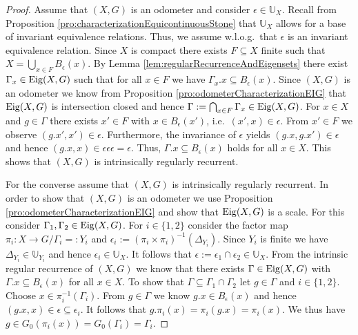 \documentclass[12pt, reqno]{amsart}
\theoremstyle{definition}
\theoremstyle{remark}
\numberwithin{equation}{section}
\theoremstyle{theorem}
\theoremstyle{remark}
\def\Eig{{\rm Eig}}
\begin{document}
\begin{proof}
    Assume that $(X,G)$ is an odometer and consider $\epsilon\in \mathbb{U}_X$. 
    Recall from Proposition \ref{pro:characterizationEquicontinuousStone} that $\mathbb{U}_X$ allows for a base of invariant equivalence relations. 
    Thus, we assume w.l.o.g.\ that $\epsilon$ is an invariant equivalence relation. 
    Since $X$ is compact there exists $F\subseteq X$ finite such that $X=\bigcup_{x\in F}B_\epsilon(x)$. 
    By Lemma \ref{lem:regularRecurrenceAndEigensets} there exist $\Gamma_x\in \Eig(X,G)$ such that for all $x\in F$ we have $\Gamma_x.x\subseteq B_\epsilon(x)$. 
    Since $(X,G)$ is an odometer we know from Proposition \ref{pro:odometerCharacterizationEIG} that $\Eig(X,G)$ is intersection closed and hence $\Gamma:=\bigcap_{x\in F}\Gamma_x\in \Eig(X,G)$. 
    For $x\in X$ and $g\in \Gamma$ there exists $x'\in F$ with $x\in B_\epsilon(x')$, i.e.\ $(x',x)\in \epsilon$.
    From $x'\in F$ we observe $(g.x',x')\in \epsilon$. 
    Furthermore, the invariance of $\epsilon$ yields $(g.x,g.x')\in \epsilon$
    and hence $(g.x,x)\in \epsilon\epsilon\epsilon=\epsilon$.
    Thus, $\Gamma.x\subseteq B_\epsilon(x)$ holds for all $x\in X$. 
    This shows that $(X,G)$ is intrinsically regularly recurrent. 

    For the converse assume that $(X,G)$ is intrinsically regularly recurrent. In order to show that $(X,G)$ is an odometer we use Proposition \ref{pro:odometerCharacterizationEIG} and show that $\Eig(X,G)$ is a scale. 
    For this consider $\Gamma_1,\Gamma_2\in \Eig(X,G)$. 
    For $i\in \{1,2\}$ consider the factor map $\pi_i\colon X\to G/ \Gamma_i=:Y_i$ and $\epsilon_i:=(\pi_i\times \pi_i)^{-1}(\Delta_{Y_i})$. 
    Since $Y_i$ is finite we have $\Delta_{Y_i}\in \mathbb{U}_{Y_i}$ and hence $\epsilon_i\in \mathbb{U}_{X}$. 
    It follows that $\epsilon:=\epsilon_1\cap \epsilon_2\in \mathbb{U}_X$. 
    From the intrinsic regular recurrence of $(X,G)$ we know that there exists $\Gamma\in \Eig(X,G)$ with $\Gamma.x\subseteq B_\epsilon(x)$ for all $x\in X$. 
    To show that $\Gamma\subseteq \Gamma_1\cap \Gamma_2$ let $g\in \Gamma$ and $i\in \{1,2\}$.
    Choose $x\in \pi_i^{-1}(\Gamma_i)$. 
    From $g\in \Gamma$ we know $g.x\in B_\epsilon(x)$ and hence $(g.x,x)\in \epsilon\subseteq \epsilon_i$. 
    It follows that $g.\pi_i(x)=\pi_i(g.x)=\pi_i(x)$. 
    We thus have 
    $g\in G_0(\pi_i(x))=G_0(\Gamma_i)=\Gamma_i$. 
\end{proof}
\end{document}
